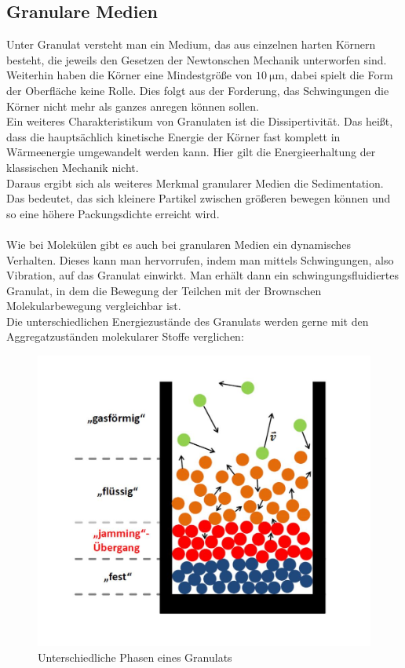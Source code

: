 \subsection{Granulare Medien}

Unter Granulat versteht man ein Medium, das aus einzelnen harten Körnern besteht, die jeweils den Gesetzen der Newtonschen Mechanik unterworfen sind. Weiterhin haben die Körner eine Mindestgröße von $\SI{10}{\micro\meter}$, dabei spielt die Form der Oberfläche keine Rolle. Dies folgt aus der Forderung, das Schwingungen die Körner nicht mehr als ganzes anregen können sollen. \\
Ein weiteres Charakteristikum von Granulaten ist die Dissipertivität. Das heißt, dass die hauptsächlich kinetische Energie der Körner fast komplett in Wärmeenergie umgewandelt werden kann. Hier gilt die Energieerhaltung der klassischen Mechanik nicht. \\
Daraus ergibt sich als weiteres Merkmal granularer Medien die Sedimentation. Das bedeutet, das sich kleinere Partikel zwischen größeren bewegen können und so eine höhere Packungsdichte erreicht wird. \\
\hfill \\ 
Wie bei Molekülen gibt es auch bei granularen Medien ein dynamisches Verhalten. Dieses kann man hervorrufen, indem man mittels Schwingungen, also Vibration, auf das Granulat einwirkt. Man erhält dann ein schwingungsfluidiertes Granulat, in dem die Bewegung der Teilchen mit der Brownschen Molekularbewegung vergleichbar ist. \\
Die unterschiedlichen Energiezustände des Granulats werden gerne mit den Aggregatzuständen molekularer Stoffe verglichen:


\begin{center}
\begin{figure}[h]
	\includegraphics[scale=0.45]{Einleitung_1.jpg}
	\caption{Unterschiedliche Phasen eines Granulats}
\end{figure}	
\end{center}


